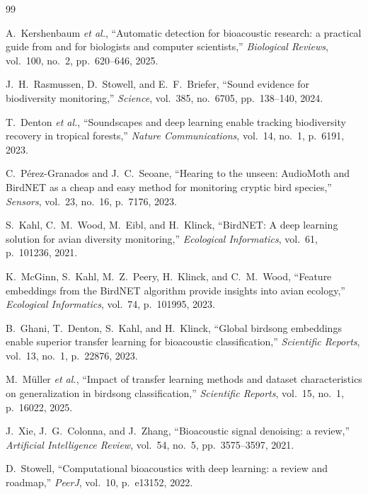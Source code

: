 \documentclass[conference]{IEEEtran}
\begin{document}
\begin{thebibliography}{99}

A.~Kershenbaum \textit{et al.}, ``Automatic detection for bioacoustic research: a practical guide from and for biologists and computer scientists,'' \textit{Biological Reviews}, vol.~100, no.~2, pp.~620--646, 2025.

J.~H.~Rasmussen, D.~Stowell, and E.~F.~Briefer, ``Sound evidence for biodiversity monitoring,'' \textit{Science}, vol.~385, no.~6705, pp.~138--140, 2024.

T.~Denton \textit{et al.}, ``Soundscapes and deep learning enable tracking biodiversity recovery in tropical forests,'' \textit{Nature Communications}, vol.~14, no.~1, p.~6191, 2023.

C.~P\'erez-Granados and J.~C.~Seoane, ``Hearing to the unseen: AudioMoth and BirdNET as a cheap and easy method for monitoring cryptic bird species,'' \textit{Sensors}, vol.~23, no.~16, p.~7176, 2023.

S.~Kahl, C.~M.~Wood, M.~Eibl, and H.~Klinck, ``BirdNET: A deep learning solution for avian diversity monitoring,'' \textit{Ecological Informatics}, vol.~61, p.~101236, 2021.

K.~McGinn, S.~Kahl, M.~Z.~Peery, H.~Klinck, and C.~M.~Wood, ``Feature embeddings from the BirdNET algorithm provide insights into avian ecology,'' \textit{Ecological Informatics}, vol.~74, p.~101995, 2023.

B.~Ghani, T.~Denton, S.~Kahl, and H.~Klinck, ``Global birdsong embeddings enable superior transfer learning for bioacoustic classification,'' \textit{Scientific Reports}, vol.~13, no.~1, p.~22876, 2023.

M.~M\"uller \textit{et al.}, ``Impact of transfer learning methods and dataset characteristics on generalization in birdsong classification,'' \textit{Scientific Reports}, vol.~15, no.~1, p.~16022, 2025.

J.~Xie, J.~G.~Colonna, and J.~Zhang, ``Bioacoustic signal denoising: a review,'' \textit{Artificial Intelligence Review}, vol.~54, no.~5, pp.~3575--3597, 2021.

D.~Stowell, ``Computational bioacoustics with deep learning: a review and roadmap,'' \textit{PeerJ}, vol.~10, p.~e13152, 2022.


\end{thebibliography}
\end{document}
